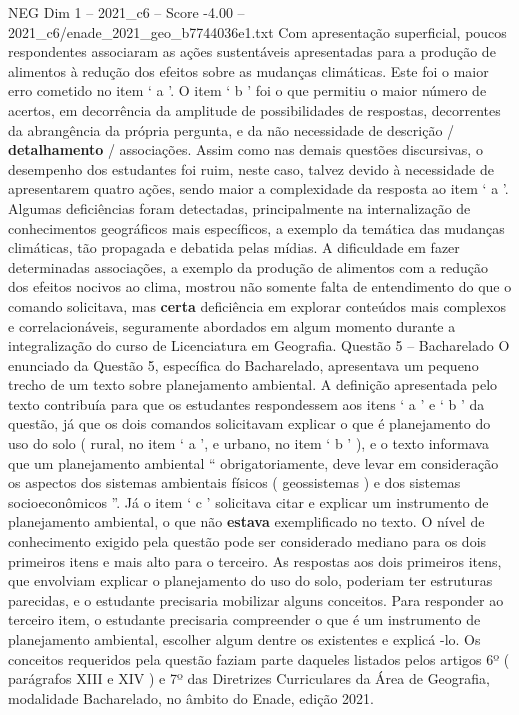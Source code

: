 \begin{textsample}{NEG Dim 1 – 2021\_c6 – Score -4.00 – 2021\_c6/enade\_2021\_geo\_b7744036e1.txt}
Com apresentação superficial, poucos respondentes associaram as ações sustentáveis apresentadas para a produção de alimentos à redução dos efeitos sobre as mudanças climáticas.
Este foi o maior erro cometido no item ‘ a ’.
O item ‘ b ’ foi o que permitiu o maior número de acertos, em decorrência da amplitude de possibilidades de respostas, decorrentes da abrangência da própria pergunta, e da não necessidade de descrição / \textbf{detalhamento} / associações.
Assim como nas demais questões discursivas, o desempenho dos estudantes foi ruim, neste caso, talvez devido à necessidade de apresentarem quatro ações, sendo maior a complexidade da resposta ao item ‘ a ’.
Algumas deficiências foram detectadas, principalmente na internalização de conhecimentos geográficos mais específicos, a exemplo da temática das mudanças climáticas, tão propagada e debatida pelas mídias.
A dificuldade em fazer determinadas associações, a exemplo da produção de alimentos com a redução dos efeitos nocivos ao clima, mostrou não somente falta de entendimento do que o comando solicitava, mas \textbf{certa} deficiência em explorar conteúdos mais complexos e correlacionáveis, seguramente abordados em algum momento durante a integralização do curso de Licenciatura em Geografia.
Questão 5 – Bacharelado O enunciado da Questão 5, específica do Bacharelado, apresentava um pequeno trecho de um texto sobre planejamento ambiental.
A definição apresentada pelo texto contribuía para que os estudantes respondessem aos itens ‘ a ’ e ‘ b ’ da questão, já que os dois comandos solicitavam explicar o que é planejamento do uso do solo ( rural, no item ‘ a ’, e urbano, no item ‘ b ’ ), e o texto informava que um planejamento ambiental “ obrigatoriamente, deve levar em consideração os aspectos dos sistemas ambientais físicos ( geossistemas ) e dos sistemas socioeconômicos ”.
Já o item ‘ c ’ solicitava citar e explicar um instrumento de planejamento ambiental, o que não \textbf{estava} exemplificado no texto.
O nível de conhecimento exigido pela questão pode ser considerado mediano para os dois primeiros itens e mais alto para o terceiro.
As respostas aos dois primeiros itens, que envolviam explicar o planejamento do uso do solo, poderiam ter estruturas parecidas, e o estudante precisaria mobilizar alguns conceitos.
Para responder ao terceiro item, o estudante precisaria compreender o que é um instrumento de planejamento ambiental, escolher algum dentre os existentes e explicá -lo.
Os conceitos requeridos pela questão faziam parte daqueles listados pelos artigos 6º ( parágrafos XIII e XIV ) e 7º das Diretrizes Curriculares da Área de Geografia, modalidade Bacharelado, no âmbito do Enade, edição 2021.

\end{textsample}

